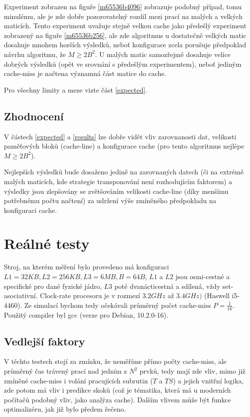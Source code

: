 \documentclass[a4paper,12pt]{article} %
\begin{document}
Experiment zobrazen na figuře \ref{m65536b4096} zobrazuje podobný případ, tomu minulému, ale je zde dobře pozorovatelný rozdíl mezi prací na malých a velkých maticích. Tento experiment uvažuje stejně velkou cache jako předešlý experiment zobrazený na figuře \ref{m65536b256}, ale zde algoritmus u dostatečně velkých matic dosahuje mnohem horších výsledků, neboť konfigurace zcela porušuje předpoklad návrhu algoritmu, že $M \geq 2 B^2$. U malých matic samozřejmě dosahuje velice dobrých výsledků (opět ve srovnání s předešlým experimentem), neboť jediným cache-miss je načtena významná část matice do cache.

Pro všechny limity a meze vizte část \ref{expected}.

\subsection{Zhodnocení}

V částech \ref{expected} a \ref{results} lze dobře vidět vliv zarovnanosti dat, velikosti paměťových bloků (cache-line) a konfigurace cache (pro tento algoritmus nejlépe $M \geq 2 B^2$).

Nejlepších výsledků bude dosaženo jedině na zarovnaných datech (či na extrémě malých maticích, kde strategie transponování není rozhodujícím faktorem) a výsledky jsou zlepšovány se zvětšováním velikosti cache-line (díky menšímu potřebnému počtu načtení) za udržení výše zmíněného předpokladu na konfiguraci cache.

\pagebreak

\section{Reálné testy}

Stroj, na kterém měření bylo provedeno má konfiguraci $L1 = 32 KB, L2 = 256 KB, L3 = 6 MB, B = 64B$, $L1$ a $L2$ jsou osmi-cestné a specifické pro dané fyzické jádro, $L3$ poté dvanácticestná a sdílená, vždy set-asociativní. Clock-rate procesoru je v rozmezí $3.2 GHz$ až $3.4 GHz)$ (Haswell i5-4460). Ze simulací bychom tedy očekávali průměrný počet cache-miss $P = \frac{1}{16}$. Použitý compiler byl gcc (verze pro Debian, 10.2.0-16).

\subsection{Vedlejší faktory}

V těchto testech stojí za zmínku, že neměříme přímo počty cache-miss, ale průměrný čas trávený prací nad jedním z $N^2$ prvků, tedy mají zde vliv, mimo již zmíněné cache-miss i volání pracujících subrutin ($T$ a $TS$) a jejich vnitřní logika, zde potom má vliv i predikce skoků (což je tématika, která má u moderních počítačů podobný vliv, jako analýza cache). Dalším vlivem může být funkce optimalizéru, jak již bylo předem řečeno.
\end{document}
